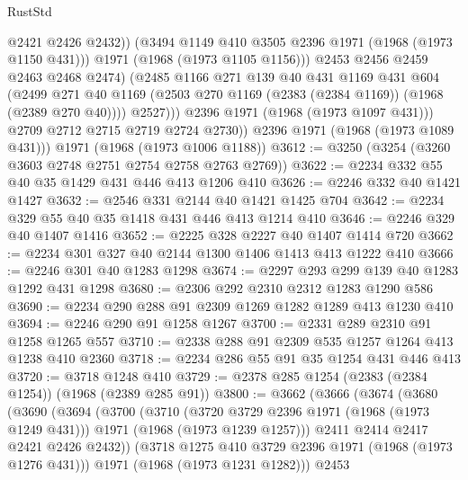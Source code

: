 \begin{lexlean}{RustStd}
\begin{coremodule}
                        @2421
                        @2426
                        @2432))
                    (@3494 @1149 @410 @3505 @2396 @1971 (@1968 (@1973 @1150 @431)))
                    @1971
                    (@1968 (@1973 @1105 @1156)))
                  @2453
                  @2456
                  @2459
                  @2463
                  @2468
                  @2474)
                (@2485
                  @1166
                  @271
                  @139
                  @40
                  @431
                  @1169
                  @431
                  @604
                  (@2499
                    @271
                    @40
                    @1169
                    (@2503 @270 @1169 (@2383 (@2384 @1169)) (@1968 (@2389 @270 @40))))
                  @2527)))
            @2396
            @1971
            (@1968 (@1973 @1097 @431)))
          @2709
          @2712
          @2715
          @2719
          @2724
          @2730))
      @2396
      @1971
      (@1968 (@1973 @1089 @431)))
    @1971
    (@1968 (@1973 @1006 @1188))
@3612 := @3250 (@3254 (@3260 @3603 @2748 @2751 @2754 @2758 @2763 @2769))
@3622 := @2234 @332 @55 @40 @35 @1429 @431 @446 @413 @1206 @410
@3626 := @2246 @332 @40 @1421 @1427
@3632 := @2546 @331 @2144 @40 @1421 @1425 @704
@3642 := @2234 @329 @55 @40 @35 @1418 @431 @446 @413 @1214 @410
@3646 := @2246 @329 @40 @1407 @1416
@3652 := @2225 @328 @2227 @40 @1407 @1414 @720
@3662 := @2234 @301 @327 @40 @2144 @1300 @1406 @1413 @413 @1222 @410
@3666 := @2246 @301 @40 @1283 @1298
@3674 := @2297 @293 @299 @139 @40 @1283 @1292 @431 @1298
@3680 := @2306 @292 @2310 @2312 @1283 @1290 @586
@3690 := @2234 @290 @288 @91 @2309 @1269 @1282 @1289 @413 @1230 @410
@3694 := @2246 @290 @91 @1258 @1267
@3700 := @2331 @289 @2310 @91 @1258 @1265 @557
@3710 := @2338 @288 @91 @2309 @535 @1257 @1264 @413 @1238 @410 @2360
@3718 := @2234 @286 @55 @91 @35 @1254 @431 @446 @413
@3720 := @3718 @1248 @410
@3729 := @2378 @285 @1254 (@2383 (@2384 @1254)) (@1968 (@2389 @285 @91))
@3800 := @3662
    (@3666
      (@3674
        (@3680
          (@3690
            (@3694
              (@3700
                (@3710
                  (@3720 @3729 @2396 @1971 (@1968 (@1973 @1249 @431)))
                  @1971
                  (@1968 (@1973 @1239 @1257)))
                @2411
                @2414
                @2417
                @2421
                @2426
                @2432))
            (@3718 @1275 @410 @3729 @2396 @1971 (@1968 (@1973 @1276 @431)))
            @1971
            (@1968 (@1973 @1231 @1282)))
          @2453

\end{coremodule}
\end{lexlean}
